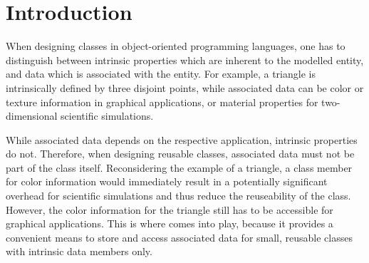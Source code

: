 
\chapter*{Introduction}    \label{intro}

When designing classes in object-oriented programming languages,
one has to distinguish between intrinsic properties which are inherent to the modelled entity,
and data which is associated with the entity. For example, a triangle is intrinsically defined
by three disjoint points, while associated data can be color or texture information in graphical applications, or material properties for two-dimensional scientific simulations.

While associated data depends on the respective application, intrinsic properties do not.
Therefore, when designing reusable classes, associated data must not be part of the class itself.
Reconsidering the example of a triangle, a class member for color information would immediately result in
a potentially significant overhead for scientific simulations and thus reduce the reuseability of the class.
However, the color information for the triangle still has to be accessible for graphical applications. This is where
{\ViennaData} comes into play, because it provides a convenient means to store and access associated data
for small, reusable classes with intrinsic data members only.

